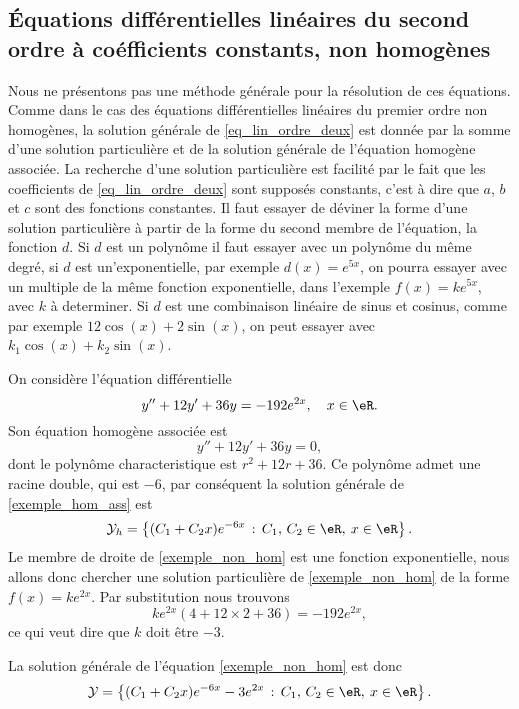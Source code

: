 \subsection{Équations différentielles linéaires du second ordre à coéfficients constants, non homogènes}

Nous ne présentons pas une méthode générale pour la résolution de ces équations. Comme dans le cas des équations différentielles linéaires du premier ordre non homogènes, la solution générale de \eqref{eq_lin_ordre_deux} est donnée par la somme d'une solution particulière et de la solution générale de l'équation homogène associée. La recherche d'une solution particulière est facilité par le fait que les coefficients de \eqref{eq_lin_ordre_deux} sont supposés constants, c'est à dire que $a$, $b$ et $c$ sont des fonctions constantes. Il faut essayer de déviner la forme d'une solution particulière à partir de la forme du second membre de l'équation, la fonction $d$. Si $d$ est un polyn\^ome  il faut essayer avec un polyn\^ome du m\^eme degré, si $d$ est un'exponentielle, par exemple $d(x) = e^{5x}$, on pourra essayer avec un multiple de la m\^eme fonction exponentielle, dans l'exemple $f(x) = k e^{5x}$, avec $k$ à determiner. Si $d$ est une combinaison linéaire de sinus et cosinus, comme par exemple $12\cos(x) + 2\sin(x)$, on peut essayer avec $k_1\cos(x) + k_2\sin(x)$. 

\begin{example}
  On considère l'équation différentielle 
  \begin{equation}\label{exemple_non_hom}
    y'' + 12y' + 36 y = -192 e^{2x}, \quad x\in\eR.
  \end{equation}
  Son équation homogène associée est 
\begin{equation}\label{exemple_hom_ass}
    y'' + 12y' + 36 y = 0,
  \end{equation}
dont le polyn\^ome characteristique est $r^2 + 12 r + 36$. Ce polyn\^ome admet une racine double, qui est $-6$, par conséquent la solution générale de \eqref{exemple_hom_ass} est 
\begin{equation*}
      \mathcal{Y}_h  = \left\{(C_1  +C_2x) e^{-6 x} \,:\, C_1,\, C_2 \in \eR, \: x\in \eR\right\}.
    \end{equation*} 
Le membre de droite de \eqref{exemple_non_hom} est une fonction exponentielle, nous allons donc chercher une solution particulière de \eqref{exemple_non_hom} de la forme $f(x) = ke^{2x}$. Par substitution nous trouvons
\[
  ke^{2x}(4 + 12 \times 2 +36) = -192 e^{2x},   
\]
ce qui veut dire que $k$ doit \^etre $-3$. 

La solution générale de l'équation \eqref{exemple_non_hom} est donc 
\begin{equation*}
      \mathcal{Y}  = \left\{(C_1  +C_2x) e^{-6 x} -3e^{2x} \,:\, C_1,\, C_2 \in \eR, \: x\in \eR\right\}.
    \end{equation*} 
\end{example}

